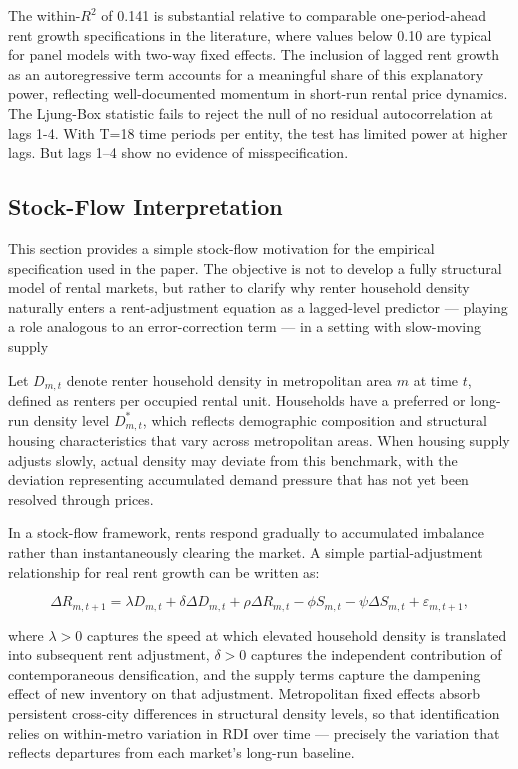 \documentclass[pdflatex,sn-basic]{sn-jnl}%
\theoremstyle{thmstyleone}%
\theoremstyle{thmstyletwo}%
\theoremstyle{thmstylethree}%
\begin{document}
The within-$R^2$ of 0.141 is substantial relative to comparable one-period-ahead 
rent growth specifications in the literature, where values below 0.10 are typical 
for panel models with two-way fixed effects. The inclusion of lagged rent growth 
as an autoregressive term accounts for a meaningful share of this explanatory 
power, reflecting well-documented momentum in short-run rental price dynamics. 
The Ljung-Box statistic fails to reject the null of no residual autocorrelation 
at lags 1-4. With T=18 time periods per entity, the test has limited power at higher lags. But lags 1–4 show no evidence of misspecification.



\subsection{Stock-Flow Interpretation}

This section provides a simple stock-flow motivation for the empirical 
specification used in the paper. The objective is not to develop a fully 
structural model of rental markets, but rather to clarify why renter household density naturally enters a rent-adjustment equation as a lagged-level predictor — playing a role analogous to an error-correction term — in a setting with slow-moving supply

Let $D_{m,t}$ denote renter household density in metropolitan area $m$ at time 
$t$, defined as renters per occupied rental unit. Households have a preferred or 
long-run density level $D^*_{m,t}$, which reflects demographic composition and 
structural housing characteristics that vary across metropolitan areas. When 
housing supply adjusts slowly, actual density may deviate from this benchmark, 
with the deviation representing accumulated demand pressure that has not yet been 
resolved through prices.

In a stock-flow framework, rents respond gradually to accumulated imbalance 
rather than instantaneously clearing the market. A simple partial-adjustment 
relationship for real rent growth can be written as:

\begin{equation}
\Delta R_{m,t+1} = \lambda D_{m,t} + \delta \Delta D_{m,t} + \rho \Delta R_{m,t} 
- \phi S_{m,t} - \psi \Delta S_{m,t} + \varepsilon_{m,t+1},
\end{equation}

where $\lambda > 0$ captures the speed at which elevated household density is 
translated into subsequent rent adjustment, $\delta > 0$ captures the 
independent contribution of contemporaneous densification, and the supply terms 
capture the dampening effect of new inventory on that adjustment. Metropolitan 
fixed effects absorb persistent cross-city differences in structural density 
levels, so that identification relies on within-metro variation in RDI over 
time --- precisely the variation that reflects departures from each market's 
long-run baseline.
\end{document}

